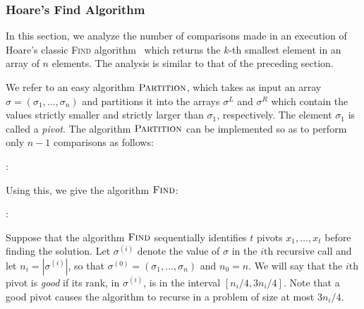 \documentclass[prodmode,acmcsur]{acmsmall}
\begin{document}
\subsubsection{Hoare's Find Algorithm}

In this section, we analyze the number of comparisons made in an
execution of Hoare's classic \textsc{Find} algorithm~\cite{hoare:find}
which returns the $k$-th smallest element in an array of $n$
elements. The analysis is similar to that of the preceding section.

We refer to an easy algorithm $\textsc{Partition}$, which takes as
input an array $\sigma = (\sigma_1, \dots, \sigma_n)$ and partitions
it into the arrays $\sigma^L$ and $\sigma^R$ which contain the values
strictly smaller and strictly larger than $\sigma_1$,
respectively. The element $\sigma_1$ is called a \emph{pivot}. The
algorithm $\textsc{Partition}$ can be implemented so as to perform
only $n - 1$ comparisons as follows:

:
\begin{algorithmic}[1]
    \ELSE
    \ENDIF
  \ENDFOR
\end{algorithmic}

Using this, we give the algorithm $\textsc{Find}$:

:
\begin{algorithmic}[1]
  \ENDIF
\end{algorithmic}

Suppose that the algorithm $\textsc{Find}$ sequentially identifies $t$
pivots $x_1, \dots, x_t$ before finding the solution. Let
$\sigma^{(i)}$ denote the value of $\sigma$ in the $i{\text{th}}$
recursive call and let $n_i=|\sigma^{(i)}|$, so that
$\sigma^{(0)}=(\sigma_1,\ldots,\sigma_n)$ and $n_0=n$.  We will say
that the $i{\text{th}}$ pivot is \emph{good} if its rank, in
$\sigma^{(i)}$, is in the interval $[n_i/4, 3n_i/4]$. Note that a good
pivot causes the algorithm to recurse in a problem of size at most
$3n_i/4$.
\end{document}
